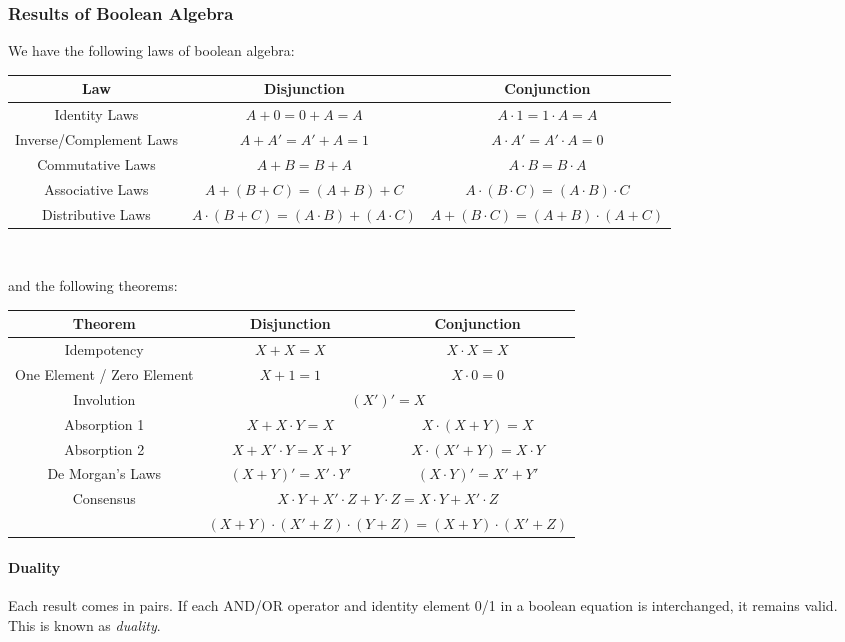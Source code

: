 \subsubsection{Results of Boolean Algebra}
We have the following laws of boolean algebra:

\centering
\begin{tabular}{c c c}
  \toprule
  Law & Disjunction & Conjunction\\
  \midrule
  Identity Laws & $A+0=0+A=A$ & $A\cdot 1=1\cdot A = A$ \\
  Inverse/Complement Laws & $A+A'=A'+A=1$ & $A\cdot A'=A'\cdot A=0$ \\
  Commutative Laws & $A+B=B+A$ & $A\cdot B=B\cdot A$ \\
  Associative Laws & $A+(B+C)=(A+B)+C$ & $A\cdot(B\cdot C)=(A\cdot B)\cdot C$ \\
  Distributive Laws & $A\cdot (B+C)=(A\cdot B)+(A\cdot C)$ & $A+(B\cdot C)=(A+B)\cdot(A+C)$ \\
  \bottomrule
\end{tabular}\\
\vspace{4mm}
\raggedright%
and the following theorems:\\
\vspace{2mm}

\centering
\begin{tabular}{c c c}
  \toprule
  Theorem & Disjunction & Conjunction \\
  \midrule
  Idempotency & $X+X=X$ & $X\cdot X=X$ \\
  One Element / Zero Element & $X+1=1$ & $X\cdot 0 = 0$ \\
  Involution & \multicolumn{2}{c}{$\left( X' \right)'=X $ } \\
  Absorption 1 & $X+X\cdot Y=X$ & $X\cdot (X+Y)=X$ \\
  Absorption 2 & $X+X'\cdot Y=X+Y$ & $X\cdot (X'+Y)=X\cdot Y$ \\
  De Morgan's Laws & $(X+Y)'=X'\cdot Y'$ & $(X\cdot Y)'=X'+Y'$ \\
  \multirow{2}{4em}{Consensus} & \multicolumn{2}{c}{$X\cdot Y+X'\cdot Z + Y\cdot Z=X\cdot Y+X'\cdot Z$}\\
  & \multicolumn{2}{c}{$(X+Y)\cdot(X'+Z)\cdot(Y+Z)=(X+Y)\cdot(X'+Z)$} \\
  \bottomrule
\end{tabular}

\raggedright%
\paragraph{Duality} Each result comes in pairs. If each AND/OR operator and
identity element 0/1 in a boolean equation is interchanged, it remains valid. This
is known as \textit{duality}.

